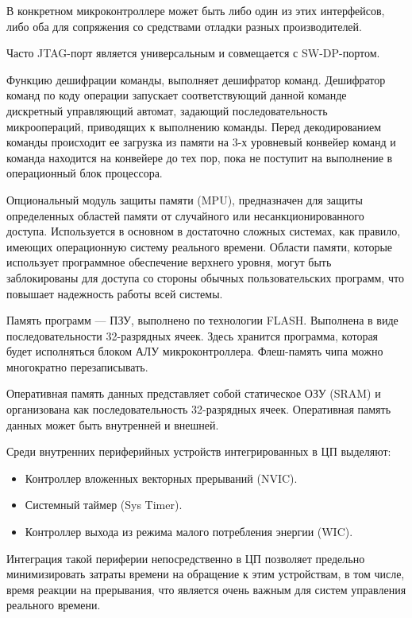 \documentclass[12pt, oneside]{altsu-report}
\begin{document}
В конкретном микроконтроллере может быть либо один из этих интерфейсов, либо оба для сопряжения со средствами отладки разных производителей.

Часто JTAG-порт является универсальным и совмещается с SW-DP-портом.

Функцию дешифрации команды, выполняет дешифратор команд. Дешифратор команд по коду операции запускает соответствующий данной команде дискретный управляющий автомат, задающий последовательность микроопераций, приводящих к выполнению команды. Перед декодированием команды происходит ее загрузка из памяти на 3-х уровневый конвейер команд и команда находится на конвейере до тех пор, пока не поступит на выполнение в операционный блок процессора.

Опциональный модуль защиты памяти (MPU), предназначен для защиты определенных областей памяти от случайного или несанкционированного доступа. Используется в основном в достаточно сложных системах, как правило, имеющих операционную систему реального времени. Области памяти, которые использует программное обеспечение верхнего уровня, могут быть заблокированы для доступа со стороны обычных пользовательских программ, что повышает надежность работы всей системы.

Память программ --- ПЗУ, выполнено по технологии FLASH. Выполнена в виде последовательности 32-разрядных ячеек. Здесь хранится программа, которая будет исполняться блоком АЛУ микроконтроллера. Флеш-память чипа можно многократно перезаписывать.

Оперативная память данных представляет собой статическое ОЗУ (SRAM) и организована как последовательность 32-разрядных ячеек. Оперативная память данных может быть внутренней и внешней.

Среди внутренних периферийных устройств интегрированных в ЦП выделяют:

\begin{itemize}
    \item Контроллер вложенных векторных прерываний (NVIC).

    \item Системный таймер (Sys Timer).

    \item Контроллер выхода из режима малого потребления энергии (WIC).
\end{itemize}

Интеграция такой периферии непосредственно в ЦП позволяет предельно минимизировать затраты времени на обращение к этим устройствам, в том числе, время реакции на прерывания, что является очень важным для систем управления реального времени.
\end{document}
